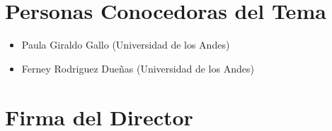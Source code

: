 \documentclass[12pt]{article}
\begin{document}
\section{Personas Conocedoras del Tema}


\begin{itemize}
	\item Paula Giraldo Gallo (Universidad de los Andes)
	\item Ferney Rodriguez Dueñas (Universidad de los Andes)
\end{itemize}





\section*{Firma del Director}
\vspace{1.5cm}
\end{document}
